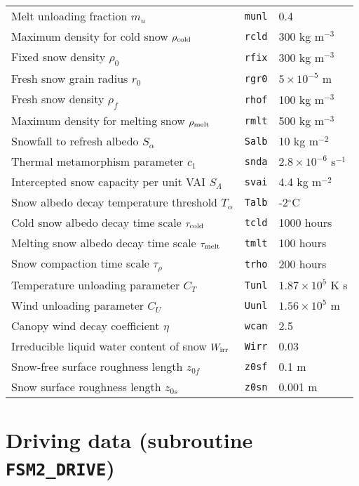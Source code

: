 \documentclass[fleqn]{article}
\begin{document}
{\begin{longtable}{|l|l|l|}
Melt unloading fraction $m_u$                      & {\tt munl} & 0.4                       \\
Maximum density for cold snow $\rho_{\rm cold}$    & {\tt rcld} & 300 kg m$^{-3}$  \\
Fixed snow density $\rho_0$                        & {\tt rfix} & 300 kg m$^{-3}$  \\
Fresh snow grain radius $r_0$                      & {\tt rgr0} & $5\times10^{-5}$ m  \\
Fresh snow density $\rho_f$                        & {\tt rhof} & 100 kg m$^{-3}$  \\
Maximum density for melting snow $\rho_{\rm melt}$ & {\tt rmlt} & 500 kg m$^{-3}$  \\
Snowfall to refresh albedo $S_\alpha$              & {\tt Salb} & 10 kg m$^{-2}$   \\
Thermal metamorphism parameter $c_1$ & {\tt snda}  & $2.8 \times 10^{-6}$ s$^{-1}$ \\
Intercepted snow capacity per unit VAI $S_\Lambda$ & {\tt svai} & 4.4 kg m$^{-2}$  \\
Snow albedo decay temperature threshold $T_\alpha$ & {\tt Talb} & -2$^\circ$C      \\
Cold snow albedo decay time scale $\tau_{\rm cold}$& {\tt tcld} & 1000 hours       \\
Melting snow albedo decay time scale $\tau_{\rm melt}$ & {\tt tmlt} & 100 hours    \\
Snow compaction time scale $\tau_\rho$             & {\tt trho} & 200 hours        \\
Temperature unloading parameter $C_T$              & {\tt Tunl} & $1.87 \times 10^5$ K s  \\
Wind unloading parameter $C_U$                     & {\tt Uunl} & $1.56 \times 10^5$ m    \\
Canopy wind decay coefficient $\eta$               & {\tt wcan} & 2.5              \\
Irreducible liquid water content of snow $W_{\rm irr}$ & {\tt Wirr} & 0.03         \\
Snow-free surface roughness length $z_{0f}$        & {\tt z0sf} & 0.1 m            \\
Snow surface roughness length $z_{0s}$             & {\tt z0sn} & 0.001 m          \\
\hline
\end{longtable}
}

\section{Driving data (subroutine {\tt FSM2\_DRIVE})}
\end{document}
